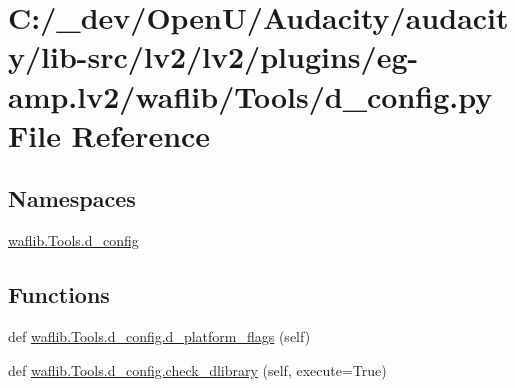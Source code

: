 \hypertarget{lv2_2plugins_2eg-amp_8lv2_2waflib_2_tools_2d__config_8py}{}\section{C\+:/\+\_\+dev/\+Open\+U/\+Audacity/audacity/lib-\/src/lv2/lv2/plugins/eg-\/amp.lv2/waflib/\+Tools/d\+\_\+config.py File Reference}
\label{lv2_2plugins_2eg-amp_8lv2_2waflib_2_tools_2d__config_8py}
\subsection*{Namespaces}
\begin{DoxyCompactItemize}
\item 
 \hyperlink{namespacewaflib_1_1_tools_1_1d__config}{waflib.\+Tools.\+d\+\_\+config}
\end{DoxyCompactItemize}
\subsection*{Functions}
\begin{DoxyCompactItemize}
\item 
def \hyperlink{namespacewaflib_1_1_tools_1_1d__config_a430d331781f08b8478d542b708c4ccf4}{waflib.\+Tools.\+d\+\_\+config.\+d\+\_\+platform\+\_\+flags} (self)
\item 
def \hyperlink{namespacewaflib_1_1_tools_1_1d__config_ae2009fc7aeda344482ce8fc8eae64f49}{waflib.\+Tools.\+d\+\_\+config.\+check\+\_\+dlibrary} (self, execute=True)
\end{DoxyCompactItemize}
